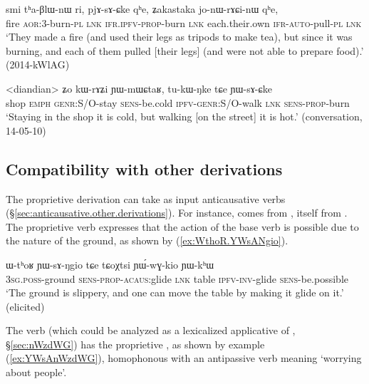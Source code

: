 \begin{exe}
\ex \label{ex:pjAsACke}
\gll smi tʰa-βlɯ-nɯ ri, pjɤ-sɤ-ɕke qʰe, ʑakastaka jo-nɯ-rɤɕi-nɯ qʰe, \\
fire \textsc{aor}:3\flobv{}-burn-\textsc{pl} \textsc{lnk} \textsc{ifr}.\textsc{ipfv}-\textsc{prop}-burn \textsc{lnk} each.their.own \textsc{ifr}-\textsc{auto}-pull-\textsc{pl} \textsc{lnk} \\
\glt `They made a fire (and used their legs as tripods to make tea), but since it was burning, and each of them pulled [their legs] (and were not able to prepare food).' (2014-kWlAG)
\end{exe}

\begin{exe}
\ex \label{ex:tukWNke.YWsACKe}
\gll <diandian> ʑo kɯ-rɤʑi ɲɯ-mɯɕtaʁ, tu-kɯ-ŋke tɕe ɲɯ-sɤ-ɕke \\
shop \textsc{emph} \textsc{genr}:S/O-stay \textsc{sens}-be.cold \textsc{ipfv}-\textsc{genr}:S/O-walk \textsc{lnk} \textsc{sens}-\textsc{prop}-burn \\
\glt `Staying in the shop it is cold, but walking [on the street] it is hot.' (conversation, 14-05-10)
\end{exe}

\subsection{Compatibility with other derivations} \label{sec:proprietive.compatibility}
The proprietive derivation can take as input anticausative verbs (§\ref{sec:anticausative.other.derivations}). For instance,   comes from  , itself from . The proprietive verb  expresses that the action of the base verb  is possible due to the nature of the ground, as shown by (\ref{ex:WthoR.YWsANgio}).


\begin{exe}
\ex \label{ex:WthoR.YWsANgio}
\gll ɯ-tʰoʁ ɲɯ-sɤ-ŋgio tɕe tɕoχtsi ɲɯ́-wɣ-kio ɲɯ-kʰɯ \\
\textsc{3sg}.\textsc{poss}-ground \textsc{sens}-\textsc{prop}-\textsc{acaus}:glide \textsc{lnk} table \textsc{ipfv}-\textsc{inv}-glide \textsc{sens}-be.possible \\
\glt `The ground is slippery, and one can move the table by making it glide on it.' (elicited)
\end{exe}
 
The verb  (which could be analyzed as a lexicalized applicative of , §\ref{sec:nWzdWG}) has the  proprietive , as shown by example (\ref{ex:YWsAnWzdWG}), homophonous with an antipassive verb meaning `worrying about people'.

